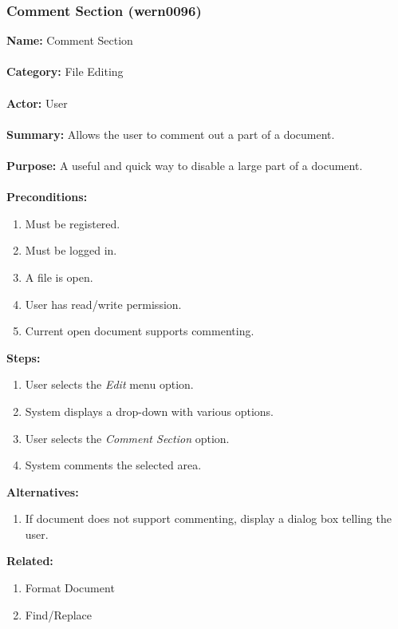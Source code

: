 \documentclass[11pt]{report}
\begin{document}
\newpage

\subsubsection{Comment Section (wern0096)}
\begin{framed}
	\noindent\textbf{Name:} Comment Section \\ \\
	\textbf{Category:} File Editing \\ \\
	\textbf{Actor:} User \\ \\
	\textbf{Summary:} Allows the user to comment out a part of a document. \\ \\
	\textbf{Purpose:} A useful and quick way to disable a large part of a document. \\ \\
	\textbf{Preconditions:} 
	\begin{enumerate}
		\item Must be registered.
		\item Must be logged in.
		\item A file is open.
		\item User has read/write permission.
		\item Current open document supports commenting.
	\end{enumerate}
	\textbf{Steps:}
	\begin{enumerate}
		\item User selects the \textit{Edit} menu option.
		\item System displays a drop-down with various options.
		\item User selects the \textit{Comment Section} option.
		\item System comments the selected area.
	\end{enumerate}
	\textbf{Alternatives:}
	\begin{enumerate}
		\item If document does not support commenting, display a dialog box telling the user.
	\end{enumerate}
	\textbf{Related:}
	\begin{enumerate}
		\item Format Document
		\item Find/Replace
	\end{enumerate}
\end{framed}
\end{document}
